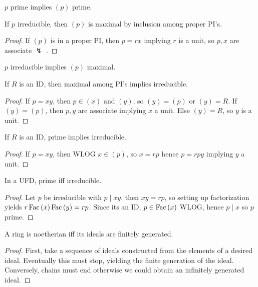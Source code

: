\begin{proposition}
\(p\) prime implies \(\left( p \right) \) 	prime.
\end{proposition}
\begin{theorem}
If \(p\) irreducible, then \( \left( p \right) \) is maximal by inclusion among proper PI's.
\end{theorem}
\begin{proof}
	If \(\left( p \right) \) is in a proper PI, then \(p = rx\) implying \(r\) is a unit, so \(p, x\) are associate \(\lightning\) .
\end{proof}
\begin{corollary}
	\(p\) irreducible implies \(\left( p \right) \) maximal.
\end{corollary}
\begin{theorem}
	If \(R\) is an ID, then maximal among PI's implies irreducible.
\end{theorem}
\begin{proof}
	If \(p = xy\), then \(p \in \left( x \right) \text{ and } \left( y \right) \), so \(\left( y \right)  = \left( p \right) \) or \(\left( y \right)  = R\). If \(\left( y \right)  = \left( p \right) \), then \(p, y\) are associate implying \(x\) a unit. Else \( \left( y \right)  = R\), so \(y\) is a unit.
\end{proof}
\begin{theorem}
	If \(R\) is an ID, prime implies irreducible.
\end{theorem}
\begin{proof}
	If \(p = xy\), then WLOG \(x \in \left( p \right) \), so \(x = rp\) hence \(p = rpy\) implying \(y\) a unit.
\end{proof}
\begin{theorem}
	In a UFD, prime iff irreducible.
\end{theorem}
\begin{proof}
Let \(p\) be irreducible with \(p \mid xy\). then \(xy = rp\), so setting up factorization yields \(r\operatorname{Fac}\left( x \right) \operatorname{Fac}\left( y \right) = rp \). Since its an ID, \(p \in \operatorname{Fac}\left( x \right) \) WLOG, hence \(p \mid x\) so \(p\) prime.
\end{proof}
\begin{theorem}
	A ring is noetherian iff its ideals are finitely generated.
\end{theorem}
\begin{proof}
	First, take a sequence of ideals constructed from the elements of a desired ideal. Eventually this must stop, yielding the finite generation of the ideal. Conversely, chains must end otherwise we could obtain an infinitely generated ideal.
\end{proof}
